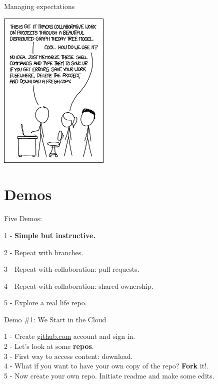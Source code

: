 \documentclass[ignorenonframetext,]{beamer}
\begin{document}
\begin{frame}{Managing expectations}
\protect\hypertarget{managing-expectations}{}

\centering

\includegraphics[height=3in]{../Images/git.png}

\end{frame}

\hypertarget{demos}{%
\section{Demos}\label{demos}}

\begin{frame}{Five Demos:}
\protect\hypertarget{five-demos}{}

1 - \textbf{Simple but instructive.}

2 - Repeat with branches.

3 - Repeat with collaboration: pull requests.

4 - Repeat with collaboration: shared ownership.

5 - Explore a real life repo.

\end{frame}

\begin{frame}{Demo \#1: We Start in the Cloud}
\protect\hypertarget{demo-1-we-start-in-the-cloud}{}

1 - Create \url{github.com} account and sign in.\\
2 - Let's look at some \textbf{repos}.\\
3 - First way to access content: download.\\
4 - What if you want to have your own copy of the repo? \textbf{Fork}
it!.\\
5 - Now create your own repo. Initiate readme and make some edits.

\end{frame}
\end{document}
